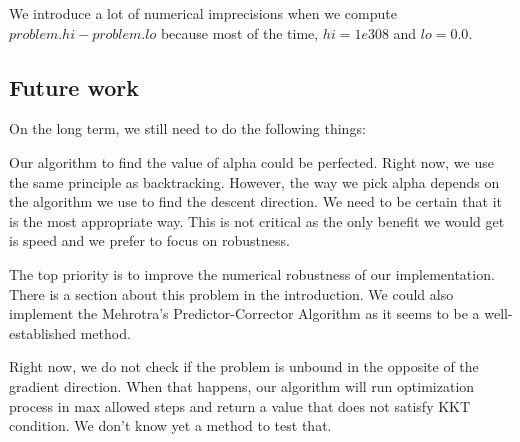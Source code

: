 We introduce a lot of numerical imprecisions when we compute $problem.hi - problem.lo$ because most of the time, $hi = 1e308$ and $lo=0.0$. 

\subsection{Future work}\label{section:future}

On the long term, we still need to do the following things:

Our algorithm to find the value of alpha could be perfected. Right now, we use the same principle as backtracking. However, the way we pick alpha depends on the algorithm we use to find the descent direction. We need to be certain that it is the most appropriate way. This is not critical as the only benefit we would get is speed and we prefer to focus on robustness.

The top priority is to improve the numerical robustness of our implementation. There is a section about this problem in the introduction. We could also implement the Mehrotra's Predictor-Corrector Algorithm as it seems to be a well-established method.

Right now, we do not check if the problem is unbound in the opposite of the gradient direction. When that happens, our algorithm will run optimization process in max allowed steps and return a value that does not satisfy KKT condition. We don't know yet a method to test that.